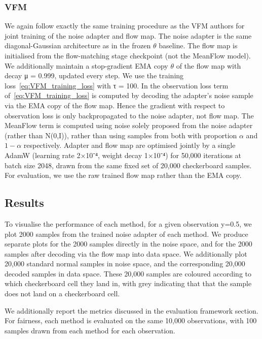\documentclass[12pt,a4paper]{report}
\begin{document}
\subsubsection{VFM}
We again follow exactly the same training procedure as the VFM authors for joint training of the noise adapter and flow map. 
The noise adapter is the same diagonal-Gaussian architecture as in the frozen $\theta$ baseline. 
The flow map is initialised from the flow-matching stage checkpoint (not the MeanFlow model). 
We additionally maintain a stop-gradient EMA copy $\theta$ of the flow map with decay μ = 0.999, updated every step.
We use the training loss~\ref{eq:VFM_training_loss} with τ = 100. 
In the observation loss term of~\ref{eq:VFM_training_loss} is computed by decoding the adapter's noise sample via the EMA copy of the flow map. Hence the gradient with respect to observation loss is only backpropagated to the noise adapter, not flow map. 
The MeanFlow term is computed using noise solely proposed from the noise adapter (rather than N(0,I)), rather than using samples from both with proportion $\alpha$ and $1-\alpha$ respectively. 
Adapter and flow map are optimised jointly by a single AdamW (learning rate 2×10⁻⁴, weight decay 1×10⁻⁴) for 50,000 iterations at batch size 2048, drawn from the same fixed set of 20,000 checkerboard samples.
For evaluation, we use the raw trained flow map rather than the EMA copy. 

\subsection{Results}
To visualise the performance of each method, for a given observation y=0.5, we plot 2000 samples from the trained noise adapter of each method. 
We produce separate plots for the 2000 samples directly in the noise space, and for the 2000 samples after decoding via the flow map into data space.
We additionally plot 20,000 standard normal samples in noise space, and the corresponding 20,000 decoded samples in data space.
These 20,000 samples are coloured according to which checkerboard cell they land in, with grey indicating that that the sample does not land on a checkerboard cell. 

We additionally report the metrics discussed in the evaluation framework section. For fairness, each method is evaluated on the same 10,000 observations, with 100 samples drawn from each method for each observation.
\end{document}
